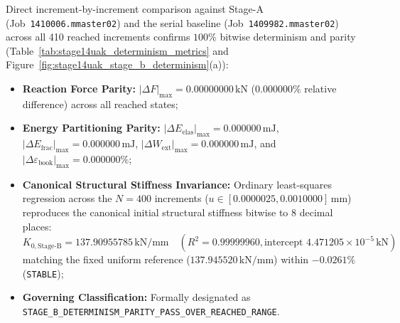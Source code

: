 Direct increment-by-increment comparison against Stage-A (Job~\texttt{1410006.mmaster02}) and the serial baseline (Job~\texttt{1409982.mmaster02}) across all 410 reached increments confirms $100\%$ bitwise determinism and parity (Table~\ref{tab:stage14uak_determinism_metrics} and Figure~\ref{fig:stage14uak_stage_b_determinism}(a)):
\begin{itemize}
  \item \textbf{Reaction Force Parity:} $|\Delta F|_{\max} = 0.00000000\,\mathrm{kN}$ ($0.000000\%$ relative difference) across all reached states;
  \item \textbf{Energy Partitioning Parity:} $|\Delta E_{\mathrm{elas}}|_{\max} = 0.000000\,\mathrm{mJ}$, $|\Delta E_{\mathrm{frac}}|_{\max} = 0.000000\,\mathrm{mJ}$, $|\Delta W_{\mathrm{ext}}|_{\max} = 0.000000\,\mathrm{mJ}$, and $|\Delta \varepsilon_{\mathrm{book}}|_{\max} = 0.000000\%$;
  \item \textbf{Canonical Structural Stiffness Invariance:} Ordinary least-squares regression across the $N=400$ increments ($u \in [0.0000025, 0.0010000]\,\mathrm{mm}$) reproduces the canonical initial structural stiffness bitwise to 8 decimal places:
  \begin{equation}
    K_{0,\text{Stage-B}} = 137.90955785\,\mathrm{kN/mm} \quad (R^2 = 0.99999960, \text{intercept } 4.471205\times 10^{-5}\,\mathrm{kN})
  \end{equation}
  matching the fixed uniform reference ($137.945520\,\mathrm{kN/mm}$) within $-0.0261\%$ (\texttt{STABLE});
  \item \textbf{Governing Classification:} Formally designated as \texttt{STAGE\_B\_DETERMINISM\_PARITY\_PASS\_OVER\_REACHED\_RANGE}.
\end{itemize}

